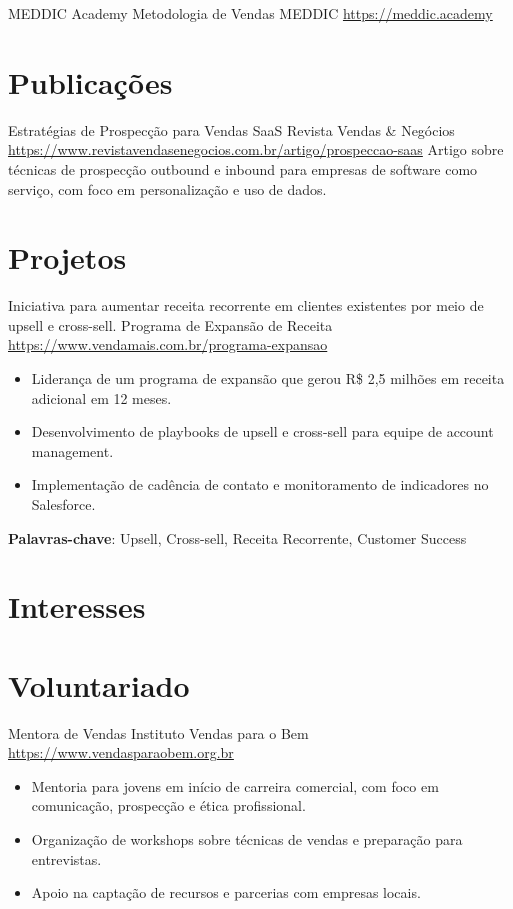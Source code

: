 \documentclass[a4paper, serif, 10pt]{moderncv}
\begin{document}
        {MEDDIC Academy}
        {Metodologia de Vendas MEDDIC}
        {\url{https://meddic.academy}}
        {}
        {}
\section{Publicações}

        {Estratégias de Prospecção para Vendas SaaS}
        {Revista Vendas \& Negócios}
        {\url{https://www.revistavendasenegocios.com.br/artigo/prospeccao-saas}}
        {}
        {Artigo sobre técnicas de prospecção outbound e inbound para empresas de software como serviço, com foco em personalização e uso de dados.}
\section{Projetos}

        {Iniciativa para aumentar receita recorrente em clientes existentes por meio de upsell e cross-sell.}
        {Programa de Expansão de Receita}
        {\url{https://www.vendamais.com.br/programa-expansao}}
        {}
        {\begin{itemize}
\item Liderança de um programa de expansão que gerou R\$ 2,5 milhões em receita adicional em 12 meses.
\item Desenvolvimento de playbooks de upsell e cross-sell para equipe de account management.
\item Implementação de cadência de contato e monitoramento de indicadores no Salesforce.
\end{itemize}
\textbf{Palavras-chave}: Upsell, Cross-sell, Receita Recorrente, Customer Success}
\section{Interesses}

\section{Voluntariado}

        {Mentora de Vendas}
        {Instituto Vendas para o Bem}
        {\url{https://www.vendasparaobem.org.br}}
        {}
        {\begin{itemize}
\item Mentoria para jovens em início de carreira comercial, com foco em comunicação, prospecção e ética profissional.
\item Organização de workshops sobre técnicas de vendas e preparação para entrevistas.
\item Apoio na captação de recursos e parcerias com empresas locais.
\end{itemize}}
    
\end{document}
